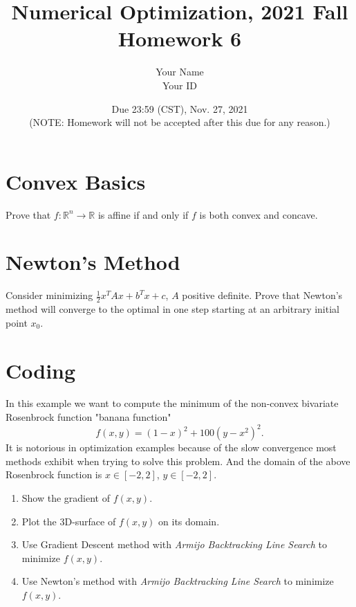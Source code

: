 \documentclass[10pt]{article}
\begin{document}
\title{Numerical Optimization, 2021 Fall\\Homework 6}
\author{Your Name\\Your ID}
\date{Due 23:59 (CST), Nov. 27, 2021 \\(NOTE: Homework will not be accepted after this due for any reason.)\\}
\maketitle


\section{Convex Basics}
Prove that $f: \mathbb{R}^n \rightarrow \mathbb{R}$ is affine if and only if $f$ is both convex and concave.


\section{Newton's Method}
Consider minimizing $\frac{1}{2} x^T Ax+b^Tx+c$, $A$ positive definite.  Prove that Newton's method will converge to the optimal in one step starting at an arbitrary initial point $x_0$.

\section{Coding}
In this example we want to compute the minimum of the non-convex bivariate Rosenbrock function "banana function"
$$
f(x,y)=(1-x)^2+100(y-x^2)^2.
$$
It is notorious in optimization examples because of the slow convergence most methods exhibit when trying to solve this problem. And the domain of the above Rosenbrock function is $x \in [-2,2]$, $y \in [-2,2]$.
\begin{enumerate}
    \item Show the gradient of $f(x,y)$.
    \item Plot the 3D-surface of $f(x,y)$ on its domain.
    \item Use Gradient Descent method with \textit{Armijo Backtracking Line Search} to minimize $f(x,y)$.
    \item Use Newton's method with \textit{Armijo Backtracking Line Search} to minimize $f(x,y)$.
\end{enumerate}
\end{document}
